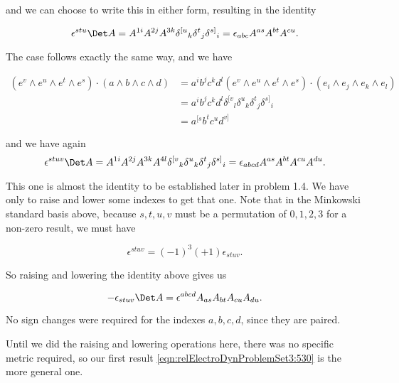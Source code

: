 and we can choose to write this in either form, resulting in the identity

\begin{equation}\label{eqn:relElectroDynProblemSet3:510}
\epsilon^{s t u} \Det A
=
A^{1 i} A^{2 j} A^{3 k}
{\delta^{[u}}_k
{\delta^{t}}_j
{\delta^{s]}}_i 
=
\epsilon_{a b c} A^{a s} A^{b t} A^{c u}.
\end{equation}

The  case follows exactly the same way, and we have

\begin{align*}
(e^v \wedge e^u \wedge e^t \wedge e^s) \cdot ( a \wedge b \wedge c \wedge d) 
&=
a^i b^j c^k d^l
(e^v \wedge e^u \wedge e^t \wedge e^s) \cdot (e_i \wedge e_j \wedge e_k \wedge e_l) \\
&=
a^i b^j c^k d^l
{\delta^{[v}}_l
{\delta^{u}}_k
{\delta^{t}}_j
{\delta^{s]}}_i \\
&=
a^{[s} b^t c^{u} d^{v]} 
\end{align*}

and we have again
\begin{equation}\label{eqn:relElectroDynProblemSet3:530}
\epsilon^{s t u v} \Det A
=
A^{1 i} A^{2 j} A^{3 k} A^{4 l}
{\delta^{[v}}_k
{\delta^{u}}_k
{\delta^{t}}_j
{\delta^{s]}}_i 
=
\epsilon_{a b c d} A^{a s} A^{b t} A^{c u} A^{d u}.
\end{equation}

This one is almost the identity to be established later in problem 1.4.  We have only to raise and lower some indexes to get that one.  Note that in the Minkowski standard basis above, because $s, t, u, v$ must be a permutation of $0,1,2,3$ for a non-zero result, we must have

\begin{equation}\label{eqn:relElectroDynProblemSet3:550}
\epsilon^{s t u v} = (-1)^3 (+1) \epsilon_{s t u v}.
\end{equation}

So raising and lowering the identity above gives us

\begin{equation}\label{eqn:relElectroDynProblemSet3:570}
-\epsilon_{s t u v} \Det A
=
\epsilon^{a b c d} A_{a s} A_{b t} A_{c u} A_{d u}.
\end{equation}

No sign changes were required for the indexes $a, b, c, d$, since they are paired.

Until we did the raising and lowering operations here, there was no specific metric required, so our first result \ref{eqn:relElectroDynProblemSet3:530} is the more general one.

